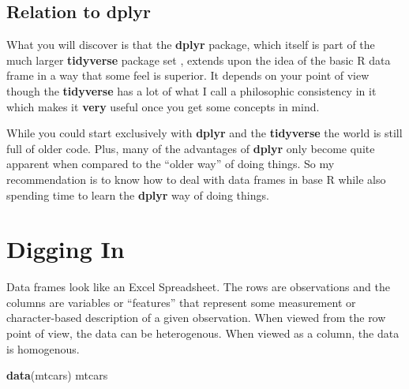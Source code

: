 \documentclass[]{book}
\newenvironment{Shaded}{\begin{snugshade}}{\end{snugshade}}
\newcommand{\KeywordTok}[1]{\textcolor[rgb]{0.13,0.29,0.53}{\textbf{#1}}}
\newcommand{\NormalTok}[1]{#1}
\begin{document}
\hypertarget{relation-to-dplyr}{%
\section{Relation to dplyr}\label{relation-to-dplyr}}

What you will discover is that the \textbf{dplyr} package, which itself is part of the much larger \textbf{tidyverse} package set , extends upon the idea of the basic R data frame in a way that some feel is superior. It depends on your point of view though the \textbf{tidyverse} has a lot of what I call a philosophic consistency in it which makes it \textbf{very} useful once you get some concepts in mind.

While you could start exclusively with \textbf{dplyr} and the \textbf{tidyverse} the world is still full of older code. Plus, many of the advantages of \textbf{dplyr} only become quite apparent when compared to the ``older way'' of doing things. So my recommendation is to know how to deal with data frames in base R while also spending time to learn the \textbf{dplyr} way of doing things.

\hypertarget{digging-in}{%
\chapter{Digging In}\label{digging-in}}

Data frames look like an Excel Spreadsheet. The rows are observations and the columns are variables or ``features'' that represent some measurement or character-based description of a given observation. When viewed from the row point of view, the data can be heterogenous. When viewed as a column, the data is homogenous.

\begin{Shaded}
\begin{Highlighting}[]
\KeywordTok{data}\NormalTok{(mtcars)}
\NormalTok{mtcars}
\end{Highlighting}
\end{Shaded}
\end{document}
